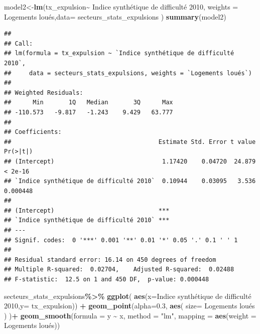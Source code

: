 \documentclass[
]{book}
\newenvironment{Shaded}{\begin{snugshade}}{\end{snugshade}}
\newcommand{\AttributeTok}[1]{\textcolor[rgb]{0.13,0.29,0.53}{#1}}
\newcommand{\FloatTok}[1]{\textcolor[rgb]{0.00,0.00,0.81}{#1}}
\newcommand{\FunctionTok}[1]{\textcolor[rgb]{0.13,0.29,0.53}{\textbf{#1}}}
\newcommand{\NormalTok}[1]{#1}
\newcommand{\OtherTok}[1]{\textcolor[rgb]{0.56,0.35,0.01}{#1}}
\newcommand{\SpecialCharTok}[1]{\textcolor[rgb]{0.81,0.36,0.00}{\textbf{#1}}}
\newcommand{\StringTok}[1]{\textcolor[rgb]{0.31,0.60,0.02}{#1}}
\begin{document}
\begin{Shaded}
\begin{Highlighting}[]
\NormalTok{model2}\OtherTok{\textless{}{-}}\FunctionTok{lm}\NormalTok{(tx\_expulsion}\SpecialCharTok{\textasciitilde{}} \StringTok{\textasciigrave{}}\AttributeTok{Indice synthétique de difficulté 2010}\StringTok{\textasciigrave{}}\NormalTok{, }\AttributeTok{weights =} \StringTok{\textasciigrave{}}\AttributeTok{Logements loués}\StringTok{\textasciigrave{}}\NormalTok{,}\AttributeTok{data=}\NormalTok{ secteurs\_stats\_expulsions )}
\FunctionTok{summary}\NormalTok{(model2)}
\end{Highlighting}
\end{Shaded}

\begin{verbatim}
## 
## Call:
## lm(formula = tx_expulsion ~ `Indice synthétique de difficulté 2010`, 
##     data = secteurs_stats_expulsions, weights = `Logements loués`)
## 
## Weighted Residuals:
##      Min       1Q   Median       3Q      Max 
## -110.573   -9.817   -1.243    9.429   63.777 
## 
## Coefficients:
##                                         Estimate Std. Error t value Pr(>|t|)
## (Intercept)                              1.17420    0.04720  24.879  < 2e-16
## `Indice synthétique de difficulté 2010`  0.10944    0.03095   3.536 0.000448
##                                            
## (Intercept)                             ***
## `Indice synthétique de difficulté 2010` ***
## ---
## Signif. codes:  0 '***' 0.001 '**' 0.01 '*' 0.05 '.' 0.1 ' ' 1
## 
## Residual standard error: 16.14 on 450 degrees of freedom
## Multiple R-squared:  0.02704,    Adjusted R-squared:  0.02488 
## F-statistic:  12.5 on 1 and 450 DF,  p-value: 0.000448
\end{verbatim}

\begin{Shaded}
\begin{Highlighting}[]
\NormalTok{secteurs\_stats\_expulsions}\SpecialCharTok{\%\textgreater{}\%}
  \FunctionTok{ggplot}\NormalTok{( }\FunctionTok{aes}\NormalTok{(}\AttributeTok{x=}\StringTok{\textasciigrave{}}\AttributeTok{Indice synthétique de difficulté 2010}\StringTok{\textasciigrave{}}\NormalTok{,}\AttributeTok{y=}\NormalTok{ tx\_expulsion)) }\SpecialCharTok{+}
  \FunctionTok{geom\_point}\NormalTok{(}\AttributeTok{alpha=}\FloatTok{0.3}\NormalTok{, }\FunctionTok{aes}\NormalTok{( }\AttributeTok{size=} \StringTok{\textasciigrave{}}\AttributeTok{Logements loués}\StringTok{\textasciigrave{}}\NormalTok{ ) )}\SpecialCharTok{+}
  \FunctionTok{geom\_smooth}\NormalTok{(}\AttributeTok{formula =}\NormalTok{ y }\SpecialCharTok{\textasciitilde{}}\NormalTok{ x, }\AttributeTok{method =} \StringTok{"lm"}\NormalTok{, }\AttributeTok{mapping =} \FunctionTok{aes}\NormalTok{(}\AttributeTok{weight =} \StringTok{\textasciigrave{}}\AttributeTok{Logements loués}\StringTok{\textasciigrave{}}\NormalTok{))}
\end{Highlighting}
\end{Shaded}
\end{document}
